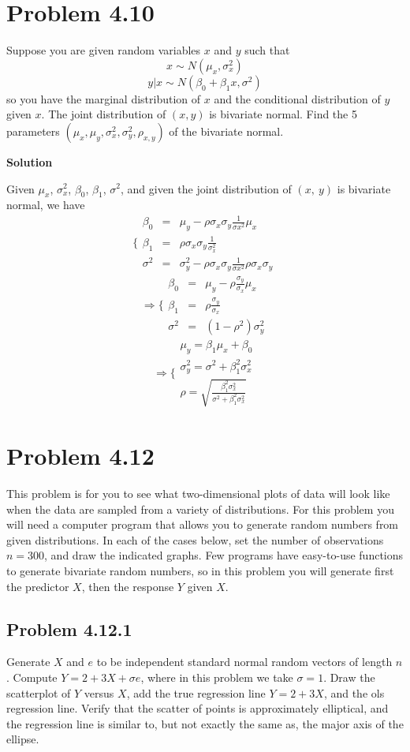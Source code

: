 \documentclass[12pt,oneside,a4paper]{article}\usepackage[]{graphicx}\usepackage[]{xcolor}
\newcommand{\problem}[1]
{
    \clearpage
    \section*{Problem {#1}}
}
\newcommand{\subproblem}[1]
{
    \subsection*{Problem {#1}}
}
\newcommand{\solution}
{
    \vspace{15pt}
    \noindent\ignorespaces\textbf{\large Solution}
}
\begin{document}
\problem{4.10}
Suppose you are given random variables $x$ and $y$ such that
$$x \sim N(\mu_{x}, \sigma_{x}^{2})$$
$$y|x \sim N(\beta_{0} + \beta_{1}x, \sigma^{2})$$
so you have the marginal distribution of $x$ and the conditional distribution of $y$ given $x$. The joint distribution of $(x, y)$ is bivariate normal. Find the 5 parameters $(\mu_{x}, \mu_{y}, \sigma_{x}^{2}, \sigma_{y}^{2}, \rho_{x,y})$ of the bivariate normal.

\solution

Given $\mu_{x}$, $\sigma_{x}^2$, $\beta_{0}$, $\beta_{1}$, $\sigma^2$, and given the joint distribution of $(x,~y)$ is bivariate normal, we have 
$$\Bigg\{ \begin{array}{lll}
\beta_{0} &=& \mu_{y} - \rho\sigma_{x}\sigma_{y}\frac{1}{\sigma{x}^2} \mu_{x}\\
\beta_{1} &=& \rho \sigma_{x} \sigma_{y} \frac{1}{\sigma_{x}^2}\\
\sigma^{2} &=& \sigma_{y}^2 - \rho\sigma_{x}\sigma_{y}\frac{1}{\sigma{x}^2}\rho\sigma_{x}\sigma_{y}
\end{array}
$$
$$
\Rightarrow \Bigg\{ \begin{array}{lll}
\beta_{0} &=& \mu_{y} - \rho\frac{\sigma_{y}}{\sigma_{x}}\mu_{x}\\
\beta_{1} &=& \rho \frac{\sigma_{y}}{\sigma_{x}}\\
\sigma^{2} &=& (1 - \rho^2)\sigma_{y}^2
\end{array}
$$
$$
\Rightarrow \Bigg\{ \begin{array}{lll}
\mu_{y} = \beta_{1}\mu_{x} + \beta_{0}\\
\sigma_{y}^2 = \sigma^2 + \beta_{1}^2\sigma_{x}^2\\
\rho = \sqrt{\frac{\beta_{1}^2 \sigma_{x}^2}{\sigma^2 + \beta_{1}^2 \sigma_{x}^2}}
\end{array}
$$

\problem{4.12}
This problem is for you to see what two-dimensional plots of data will look like when the data are sampled from a variety of distributions. For this problem you will need a computer program that allows you to generate random numbers from given distributions. In each of the cases below, set the number of observations $n = 300$, and draw the indicated graphs. Few programs have easy-to-use functions to generate bivariate random numbers, so in this problem you will generate first the predictor $X$, then the response $Y$ given $X$.

\subproblem{4.12.1}
Generate $X$ and $e$ to be independent standard normal random vectors of length $n$. Compute $Y = 2 + 3X + \sigma e$, where in this problem we take $\sigma = 1$. Draw the scatterplot of $Y$ versus $X$, add the true regression line $Y = 2 + 3X$, and the ols regression line. Verify that the scatter of points is approximately elliptical, and the regression line is similar to, but not exactly the same as, the major axis of the ellipse.
\end{document}
